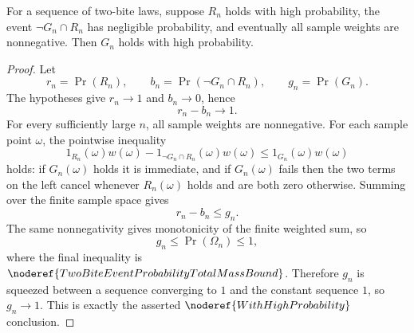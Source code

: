 \begin{helper}
For a sequence of two-bite laws, suppose \(R_n\) holds with high probability,
the event \(\neg G_n\cap R_n\) has negligible probability, and eventually all
sample weights are nonnegative.  Then \(G_n\) holds with high probability.
\end{helper}
\begin{proof}
Let
\[
r_n=\Pr(R_n),\qquad b_n=\Pr(\neg G_n\cap R_n),\qquad g_n=\Pr(G_n).
\]
The hypotheses give \(r_n\to1\) and \(b_n\to0\), hence
\[
r_n-b_n\to1.
\]
For every sufficiently large \(n\), all sample weights are nonnegative.  For
each sample point \(\omega\), the pointwise inequality
\[
1_{R_n}(\omega)w(\omega)-1_{\neg G_n\cap R_n}(\omega)w(\omega)
\le 1_{G_n}(\omega)w(\omega)
\]
holds: if \(G_n(\omega)\) holds it is immediate, and if \(G_n(\omega)\) fails
then the two terms on the left cancel whenever \(R_n(\omega)\) holds and are
both zero otherwise.  Summing over the finite sample space gives
\[
r_n-b_n\le g_n.
\]
The same nonnegativity gives monotonicity of the finite weighted sum, so
\[
g_n\le \Pr(\Omega_n)\le 1,
\]
where the final inequality is
\(\noderef{TwoBiteEventProbabilityTotalMassBound}\).  Therefore \(g_n\) is
squeezed between a sequence converging to \(1\) and the constant sequence
\(1\), so \(g_n\to1\).  This is exactly the asserted
\(\noderef{WithHighProbability}\) conclusion.
\end{proof}
